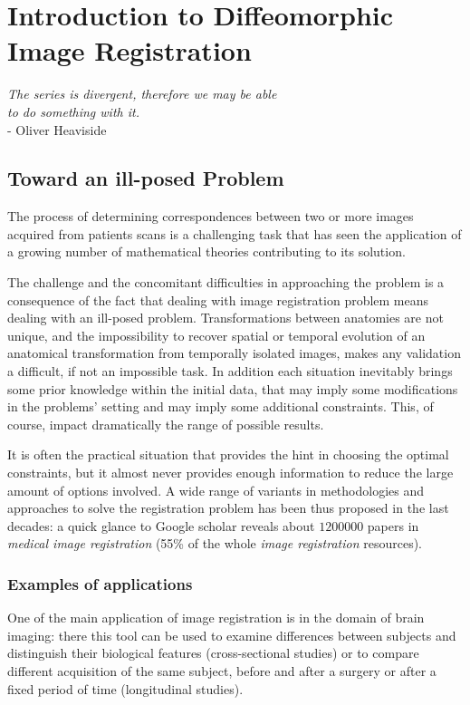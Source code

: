 \chapter{Introduction to Diffeomorphic Image Registration}\label{ch:introduction}


\begin{flushright}
		\emph{The series is divergent, therefore we may be able \\ to do something with it.}\\
			- Oliver Heaviside
\end{flushright}

\vspace{0.6cm}


\section{Toward an ill-posed Problem}
The process of determining correspondences between two or more images acquired from patients scans is a challenging task that has seen the application of a growing number of mathematical theories contributing to its solution.

The challenge and the concomitant difficulties in approaching the problem is a consequence of the fact that dealing with image registration problem means dealing with an ill-posed problem. Transformations between anatomies are not unique, and the impossibility to recover spatial or temporal evolution of an anatomical transformation from temporally isolated images, makes any validation a difficult, if not an impossible task. 
In addition each situation inevitably brings some prior knowledge within the initial data, that may imply some modifications in the problems' setting and may imply some additional constraints. This, of course, impact dramatically the range of possible results. 

It is often the practical situation that provides the hint in choosing the optimal constraints, but it almost never provides enough information to reduce the large amount of options involved. A wide range of variants in methodologies and approaches to solve the registration problem has been thus proposed in the last decades: a quick glance to Google scholar reveals about $1200000$ papers in \emph{medical image registration} (55\% of the whole \emph{image registration} resources). 

\subsection{Examples of applications}
One of the main application of image registration is in the domain of brain imaging: there this tool can be used to examine differences between subjects and distinguish their biological features (cross-sectional studies) or to compare different acquisition of the same subject, before and after a surgery or after a fixed period of time (longitudinal studies). 

